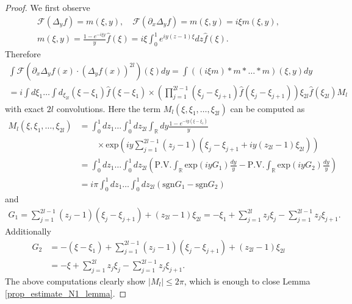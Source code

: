 \documentclass[11pt]{article}
\newcommand{\PV}{\mathrm{P.V.}}
\theoremstyle{definition}
\numberwithin{equation}{section}
\begin{document}
\begin{proof}
    We first observe
    \begin{gather}
        \mathscr{F}(\Delta_yf)=m(\xi,y),\quad  \mathscr{F}(\partial_x\Delta_yf)=m(\xi,y)=i\xi m(\xi,y),\\
        m(\xi,y)=\frac{1-e^{-i\xi y}}{y}\hat{f}(\xi)=i\xi\int_0^1e^{iy(z-1)\xi}dz\hat{f}(\xi).
    \end{gather}
    Therefore
    \begin{gather}
        \int \mathscr{F}(\partial_x\Delta_yf(x)\cdot(\Delta_yf(x))^{2l})
        (\xi)dy=\int((i\xi m)*m*\dots*m)(\xi,y)dy\\
        =i\int d\xi_1\dots\int d_{\xi_{2l}}
(\xi-\xi_1)\hat{f}(\xi-\xi_1)\times\left(\prod_{j=1}^{2l-1}(\xi_j-\xi_{j+1})\hat{f}(\xi_j-\xi_{j+1})\right)\xi_{2l}\hat{f}(\xi_{2l})M_l    \end{gather}
with exact $2l$ convolutions. Here the term $M_l(\xi,\xi_1,\dots,\xi_{2l})$ can be computed as
\begin{align}
    M_l(\xi,\xi_1,\dots,\xi_{2l})&=\int_0^1dz_1\dots\int_0^1dz_{2l}\int_{\mathbb{R}}dy\frac{1-e^{-iy(\xi-\xi_1)}}{y}\\
    &\quad\quad \times \text{exp}\left(iy\sum_{j=1}^{2l-1}(z_j-1)(\xi_j-\xi_{j+1}+iy(z_{2l}-1)\xi_{2l})\right)\\
    &=\int_0^1dz_1\dots\int_0^1dz_{2l}\left(\PV\int_{\mathbb{R}}\text{exp}(iyG_1)\frac{dy}{y}-\PV\int_{\mathbb{R}}\text{exp}(iyG_2)\frac{dy}{y}\right)\\
    &=i\pi\int_0^1dz_1\dots\int_0^1dz_{2l}(\text{sgn}G_1-\text{sgn}G_2)
\end{align}
and
\begin{align}
    G_1=\sum_{j=1}^{2l-1}(z_j-1)(\xi_j-\xi_{j+1})+(z_{2l}-1)\xi_{2l}=-\xi_1+\sum_{j=1}^{2l}z_j\xi_j-\sum_{j=1}^{2l-1}z_j\xi_{j+1}.
\end{align}
Additionally
\begin{align}
    G_2&=-(\xi-\xi_1)+\sum_{j=1}^{2l-1}(z_j-1)(\xi_j-\xi_{j+1})+(z_{2l}-1)\xi_{2l}\\
    &=-\xi+\sum_{j=1}^{2l}z_j\xi_j-\sum_{j=1}^{2l-1}z_j\xi_{j+1}.
\end{align}
The above computations clearly show $|M_l|\leq2\pi$, which is enough to close Lemma \ref{prop_estimate_N1_lemma}.
\end{proof}
\end{document}
